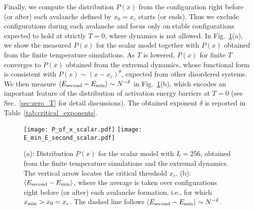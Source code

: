 \documentclass[pre,twocolumn,superscriptaddress,tightenlines,showpacs,longbibliography,floatfix,footinbib]{revtex4-1}
\begin{document}
Finally, we compute the distribution $P(x)$ from the configuration right before (or after) each avalanche defined by $x_0=x_c$ starts (or ends). Thus we exclude configurations during each avalanche and focus only on stable configurations expected to hold at strictly $T=0$, where dynamics is not allowed.
In Fig.~\ref{fig:scalar_P_of_x_zero}(a), we show the measured $P(x)$ for the scalar model together with $P(x)$ obtained from the finite temperature simulations. 
As $T$ is lowered, $P(x)$ for finite $T$ converges to $P(x)$ obtained from the extremal dynamics, whose functional form is consistent with $P(x) \sim (x-x_c)^{\theta}$, expected from other disordered systems.
We then measure 
$\langle E_{\rm second}-E_{\rm min}\rangle \sim N^{-\delta}$ in Fig.~\ref{fig:scalar_P_of_x_zero}(b), which encodes an important feature of the distribution of activation energy barriers at $T=0$ (see Sec.~\ref{sec:zero_T} for detail discussions).
The obtained exponent $\delta$ is reported in Table~\ref{tab:critical_exponents}.

\begin{figure}
\centering
\texttt{[image: P\_of\_x\_scalar.pdf]}
\texttt{[image: E\_min\_E\_second\_scalar.pdf]}
\caption{(a): Distribution $P(x)$ for the scalar model with $L=256$, obtained from the finite temperature simulations and the extremal dynamics.
The vertical arrow locates the critical threshold $x_c$.
(b): $\langle E_{\rm second}-E_{\rm min}\rangle$, where the average is taken over configurations right before (or after) each avalanche formation, i.e., for which $x_{\rm min} > x_0=x_c$. The dashed line follows $\langle E_{\rm second}-E_{\rm min}\rangle \sim N^{-\delta}$.}
\label{fig:scalar_P_of_x_zero}
\end{figure}




\end{document}
